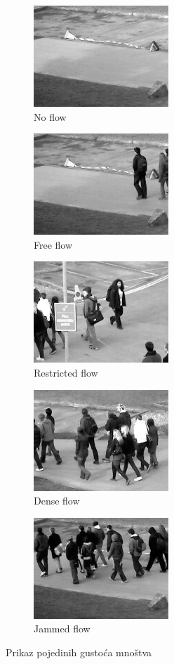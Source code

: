 \documentclass[times, utf8, zavrsni, numeric]{fer}
\begin{document}
\begin{figure}[ht]
	\begin{subfigure}[b]{0.19\linewidth}
		\centering
		\includegraphics[scale=0.5]{img/noflow.jpg}
		\caption{No flow}
	\end{subfigure}
	\begin{subfigure}[b]{0.19\linewidth}
		\centering
		\includegraphics[scale=0.5]{img/freeflow.jpg}
		\caption{Free flow}
	\end{subfigure}
	\begin{subfigure}[b]{0.19\linewidth}
		\centering
		\includegraphics[scale=0.5]{img/restrictedflow.jpg}
		\caption{Restricted flow}
	\end{subfigure}
	\begin{subfigure}[b]{0.19\linewidth}
		\centering
		\includegraphics[scale=0.5]{img/denseflow.jpg}
		\caption{Dense flow}
	\end{subfigure}
	\begin{subfigure}[b]{0.19\linewidth}
		\centering
		\includegraphics[scale=0.5]{img/jammedflow.jpg}
		\caption{Jammed flow}
	\end{subfigure}
\caption{Prikaz pojedinih gustoća mnoštva}
\end{figure}
\end{document}
